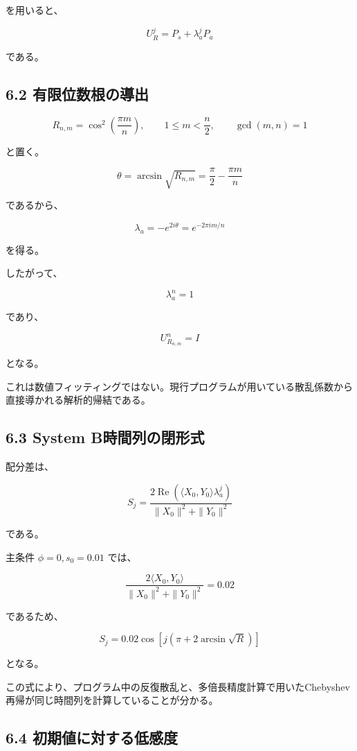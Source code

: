 \documentclass[
  10pt,
  a4paper,
]{article}
\begin{document}
を用いると、

\[
\boxed{
U_R^j=P_s+\lambda_a^jP_a
}
\]

である。

\subsection{6.2
有限位数根の導出}\label{ux6709ux9650ux4f4dux6570ux6839ux306eux5c0eux51fa}

\[
R_{n,m}
=\cos^2\left(\frac{\pi m}{n}\right),
\qquad
1\le m<\frac n2,
\qquad
\gcd(m,n)=1
\]

と置く。

\[
\theta
=\arcsin\sqrt{R_{n,m}}
=\frac{\pi}{2}-\frac{\pi m}{n}
\]

であるから、

\[
\lambda_a
=-e^{2i\theta}
=e^{-2\pi i m/n}
\]

を得る。

したがって、

\[
\lambda_a^n=1
\]

であり、

\[
\boxed{
U_{R_{n,m}}^n=I
}
\]

となる。

これは数値フィッティングではない。現行プログラムが用いている散乱係数から直接導かれる解析的帰結である。

\subsection{6.3 System
B時間列の閉形式}\label{system-bux6642ux9593ux5217ux306eux9589ux5f62ux5f0f}

配分差は、

\[
S_j=
\frac{2\operatorname{Re}
\left(
\langle X_0,Y_0\rangle\lambda_a^j
\right)}
{\|X_0\|^2+\|Y_0\|^2}
\]

である。

主条件 \(\phi=0,s_0=0.01\) では、

\[
\frac{2\langle X_0,Y_0\rangle}
{\|X_0\|^2+\|Y_0\|^2}
=0.02
\]

であるため、

\[
\boxed{
S_j
=0.02\cos\left[
j\left(
\pi+2\arcsin\sqrt R
\right)
\right]
}
\]

となる。

この式により、プログラム中の反復散乱と、多倍長精度計算で用いたChebyshev再帰が同じ時間列を計算していることが分かる。

\subsection{6.4
初期値に対する低感度}\label{ux521dux671fux5024ux306bux5bfeux3059ux308bux4f4eux611fux5ea6}
\end{document}
